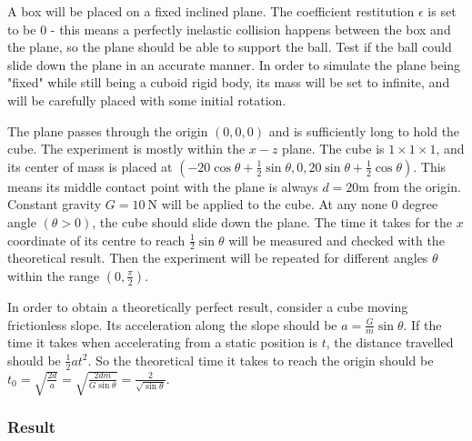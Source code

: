 \documentclass[12pt,a4paper,twoside,openright]{report}
\begin{document}
A box will be placed on a fixed inclined plane. The coefficient restitution $\epsilon$ is set to be $0$ - this means a perfectly inelastic collision happens between the box and the plane, so the plane should be able to support the ball. Test if the ball could slide down the plane in an accurate manner. In order to simulate the plane being "fixed" while still being a cuboid rigid body, its mass will be set to infinite, and will be carefully placed with some initial rotation.

The plane passes through the origin $(0, 0, 0)$ and is sufficiently long to hold the cube. The experiment is mostly within the $x-z$ plane. The cube is $1 \times 1 \times 1$, and its center of mass is placed at $(-20\cos \theta + \frac{1}{2}\sin \theta, 0, 20\sin\theta+\frac{1}{2}\cos \theta)$. This means its middle contact point with the plane is always $d=20$m from the origin. Constant gravity $G = \SI{10}{\N}$ will be applied to the cube. At any none $0$ degree angle $(\theta > 0)$, the cube should slide down the plane. The time it takes for the $x$ coordinate of its centre to reach $\frac{1}{2}\sin \theta$ will be measured and checked with the theoretical result. Then the experiment will be repeated for different angles $\theta$ within the range $(0, \frac{\pi}{2})$.

In order to obtain a theoretically perfect result, consider a cube moving frictionless slope. Its acceleration along the slope should be $a=\frac{G}{m}\sin \theta$. If the time it takes when accelerating from a static position is $t$, the distance travelled should be $\frac{1}{2}at^2$. So the theoretical time it takes to reach the origin should be $t_0=\sqrt{\frac{2d}{a}}=\sqrt{\frac{2dm}{G\sin \theta}}=\frac{2}{\sqrt{\sin\theta}}$.

\begin{center}
\end{center}

\subsubsection{Result}
\end{document}
